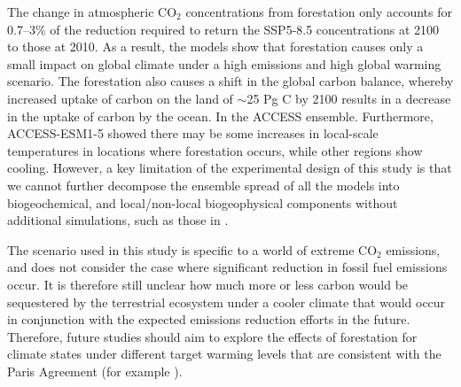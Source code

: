 \documentclass[]{article}
\begin{document}
The change in atmospheric CO$_2$ concentrations from forestation only accounts for 0.7--3\% of the reduction required to return the SSP5-8.5 concentrations at 2100 to those at 2010.
As a result, the models show that forestation causes only a small impact on global climate under a high emissions and high global warming scenario.
The forestation also causes a shift in the global carbon balance, whereby increased uptake of carbon on the land of $\sim$25 Pg C by 2100 results in a decrease in the uptake of carbon by the ocean.
In the ACCESS ensemble.
Furthermore, ACCESS-ESM1-5 showed there may be some increases in local-scale temperatures in locations where forestation occurs, while other regions show cooling.
However, a key limitation of the experimental design of this study is that we cannot further decompose the ensemble spread of all the models into biogeochemical, and local/non-local biogeophysical components without additional simulations, such as those in \cite{winckler_nonlocal_2019}.

The scenario used in this study is specific to a world of extreme CO$_2$ emissions, and does not consider the case where significant reduction in fossil fuel emissions occur.
It is therefore still unclear how much more or less carbon would be sequestered by the terrestrial ecosystem under a cooler climate that would occur in conjunction with the expected emissions reduction efforts in the future.
Therefore, future studies should aim to explore the effects of forestation for climate states under different target warming levels that are consistent with the Paris Agreement  (for example \cite{king_studying_2021}).
\end{document}
